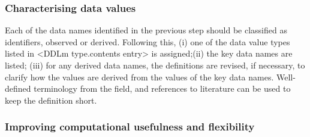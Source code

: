 \subsubsection{Characterising data values}

Each of the data names identified in the previous step should be classified
as identifiers, observed or derived. Following this, (i) one of the
data value types listed in <DDLm type.contents entry> is assigned;(ii)
the key data names are listed; (iii) for any derived data names, the
definitions are revised, if necessary, to clarify how the values are
derived from the values of the key data names. Well-defined terminology
from the field, and references to literature can be used to keep the
definition short.

\subsubsection{\label{subsec:Increasing-computational-usefuln}Improving computational
usefulness and flexibility}


